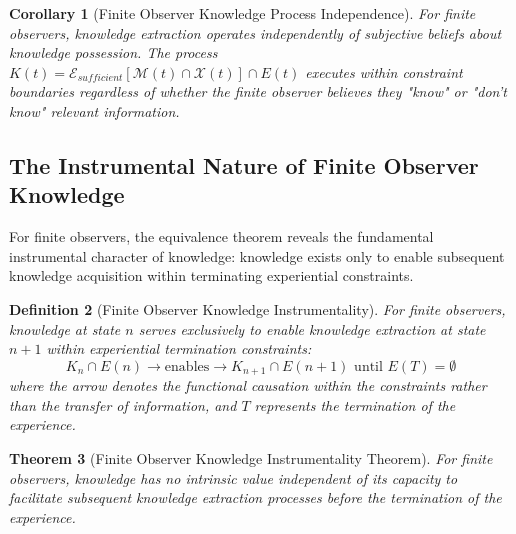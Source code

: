 \documentclass{article}
\newtheorem{theorem}{Theorem}[section]
\newtheorem{corollary}[theorem]{Corollary}
\newtheorem{definition}[theorem]{Definition}
\begin{document}
\begin{corollary}[Finite Observer Knowledge Process Independence]
For finite observers, knowledge extraction operates independently of subjective beliefs about knowledge possession. The process $K(t) = \mathcal{E}_{sufficient}[\mathcal{M}(t) \cap \mathcal{X}(t)] \cap E(t)$ executes within constraint boundaries regardless of whether the finite observer believes they "know" or "don't know" relevant information.
\end{corollary}

\subsection{The Instrumental Nature of Finite Observer Knowledge}

For finite observers, the equivalence theorem reveals the fundamental instrumental character of knowledge: knowledge exists only to enable subsequent knowledge acquisition within terminating experiential constraints.

\begin{definition}[Finite Observer Knowledge Instrumentality]
For finite observers, knowledge at state $n$ serves exclusively to enable knowledge extraction at state $n+1$ within experiential termination constraints:
\begin{equation}
K_n \cap E(n) \rightarrow \text{enables} \rightarrow K_{n+1} \cap E(n+1) \text{ until } E(T) = \emptyset
\end{equation}
where the arrow denotes the functional causation within the constraints rather than the transfer of information, and $T$ represents the termination of the experience.
\end{definition}

\begin{theorem}[Finite Observer Knowledge Instrumentality Theorem]
For finite observers, knowledge has no intrinsic value independent of its capacity to facilitate subsequent knowledge extraction processes before the termination of the experience.
\end{theorem}
\end{document}
